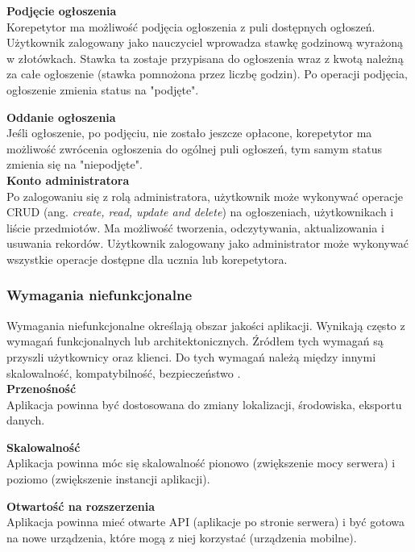 \documentclass[12pt]{article}
\numberwithin{figure}{section}
\begin{document}
\begin{sloppypar}
\noindent
\textbf{Podjęcie ogłoszenia}\\
\indent
Korepetytor ma możliwość podjęcia ogłoszenia z puli dostępnych ogłoszeń. Użytkownik zalogowany jako nauczyciel wprowadza stawkę godzinową wyrażoną w złotówkach. Stawka ta zostaje przypisana do ogłoszenia wraz z kwotą należną za całe ogłoszenie (stawka pomnożona przez liczbę godzin). Po operacji podjęcia, ogłoszenie zmienia status na "podjęte".

\noindent
\textbf{Oddanie ogłoszenia}\\
\indent
Jeśli ogłoszenie, po podjęciu, nie zostało jeszcze opłacone, korepetytor ma możliwość zwrócenia ogłoszenia do ogólnej puli ogłoszeń, tym samym status zmienia się na "niepodjęte".\\

\noindent
\textbf{Konto administratora}\\
\indent
Po zalogowaniu się z rolą administratora, użytkownik może wykonywać operacje CRUD (ang. \textit{create, read, update and delete}) na ogłoszeniach, użytkownikach i liście przedmiotów. Ma możliwość tworzenia, odczytywania, aktualizowania i usuwania rekordów. Użytkownik zalogowany jako administrator może wykonywać wszystkie operacje dostępne dla ucznia lub korepetytora.

\subsubsection{Wymagania niefunkcjonalne}

Wymagania niefunkcjonalne określają obszar jakości aplikacji. Wynikają często z wymagań funkcjonalnych lub architektonicznych. Źródłem tych wymagań są przyszli użytkownicy oraz klienci. Do tych wymagań należą między innymi skalowalność, kompatybilność, bezpieczeństwo \cite{niefunkcjonalne}.\\
\noindent
\textbf{Przenośność}\\
\indent
Aplikacja powinna być dostosowana do zmiany lokalizacji, środowiska, eksportu danych.

\noindent
\textbf{Skalowalność}\\
\indent
Aplikacja powinna móc się skalowalność pionowo (zwiększenie mocy serwera) i poziomo (zwiększenie instancji aplikacji).

\noindent
\textbf{Otwartość na rozszerzenia}\\
\indent
Aplikacja powinna mieć otwarte API (aplikacje po stronie serwera) i być gotowa na nowe urządzenia, które mogą z niej korzystać (urządzenia mobilne).


\end{sloppypar}
\end{document}
